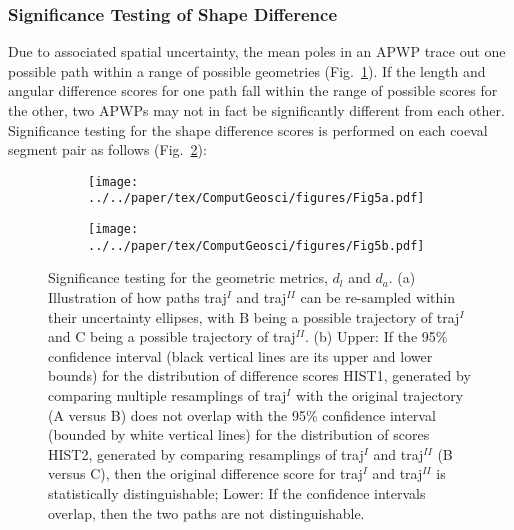 \subsubsection{Significance Testing of Shape Difference}\label{sec:shapeSigTest}

Due to associated spatial uncertainty, the mean poles in an APWP trace out one
possible path within a range of possible geometries (Fig.~\ref{fig:Fig5a}). If
the length and angular difference scores for one path fall within the range of
possible scores for the other, two APWPs may not in fact be significantly
different from each other. Significance testing for the shape difference scores
is performed on each coeval segment pair as follows (Fig.~\ref{fig:Fig5b}):

\begin{figure*}[!ht]
  \captionsetup[subfigure]{singlelinecheck=off,justification=raggedright,aboveskip=-6pt,belowskip=-6pt}
  \centering
  \begin{subfigure}[htbp]{.495\textwidth}
    \centering
    \caption{}\label{fig:Fig5a}
    \texttt{[image: ../../paper/tex/ComputGeosci/figures/Fig5a.pdf]}
  \end{subfigure}
  \begin{subfigure}[htbp]{.495\textwidth}
    \centering
    \caption{}\label{fig:Fig5b}
    \texttt{[image: ../../paper/tex/ComputGeosci/figures/Fig5b.pdf]}
  \end{subfigure}
\caption[Testing on geometry]{Significance testing for the geometric metrics,
$d_l$ and $d_a$. (a) Illustration of how paths traj$^I$ and traj$^{II}$ can be
re-sampled within their uncertainty ellipses, with B being a possible
trajectory of traj$^I$ and C being a possible trajectory of traj$^{II}$. (b)
Upper: If the 95\% confidence interval (black vertical lines are its upper and
lower bounds) for the distribution of difference scores HIST1, generated by
comparing multiple resamplings of traj$^I$ with the original trajectory (A versus B)
does not overlap with the 95\% confidence interval (bounded by white vertical
lines) for the distribution of scores HIST2, generated by comparing resamplings
of traj$^I$ and traj$^{II}$ (B versus C), then the original difference score for
traj$^I$ and traj$^{II}$ is statistically distinguishable; Lower: If the
confidence intervals overlap, then the two paths are not
distinguishable.}\label{fig:Fig5}
\end{figure*}

